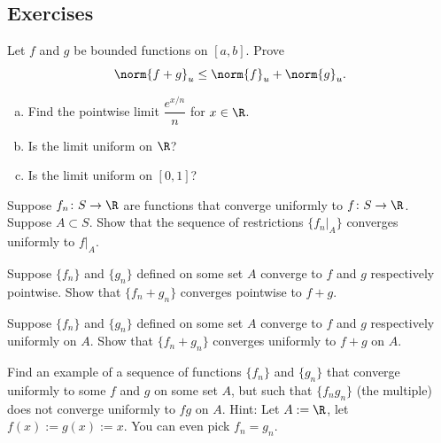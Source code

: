 \documentclass[12pt]{book}
\begin{document}
\subsection*{Exercises}

\begin{exercise}
Let $f$ and $g$ be bounded functions on $[a,b]$.
Prove 
\begin{equation*}
\norm{f+g}_u \leq \norm{f}_u + \norm{g}_u .
\end{equation*}
\end{exercise}


\begin{exercise}
\begin{enumerate}[a)]
 \item Find the pointwise limit $\dfrac{e^{x/n}}{n}$ for $x \in \R$.
  \item Is the limit uniform on $\R$?
   \item Is the limit uniform on $[0,1]$?
\end{enumerate}
\end{exercise}

\begin{exercise}
Suppose $f_n \colon S \to \R$ are functions that converge uniformly
to $f \colon S \to \R$.
Suppose $A \subset S$.
Show that
the sequence of restrictions $\{ f_n|_A \}$ converges uniformly to $f|_A$.
\end{exercise}

\begin{exercise}
Suppose $\{ f_n \}$ and $\{ g_n \}$ defined on some set $A$ converge to
$f$ and $g$ respectively pointwise.
Show that $\{ f_n+g_n \}$ converges
pointwise to $f+g$.
\end{exercise}

\begin{exercise}
Suppose $\{ f_n \}$ and $\{ g_n \}$ defined on some set $A$ converge to
$f$ and $g$ respectively uniformly on $A$.
Show that $\{ f_n+g_n \}$
converges uniformly to $f+g$ on $A$.
\end{exercise}

\begin{exercise}
Find an example of a sequence of functions $\{ f_n \}$ and $\{ g_n \}$
that converge uniformly to some $f$ and $g$ on some set $A$, but such that
$\{ f_ng_n \}$ (the multiple) does not converge uniformly to $fg$ on $A$.
Hint: Let $A := \R$, let $f(x):=g(x) := x$.
You can even pick $f_n = g_n$.
\end{exercise}
\end{document}
